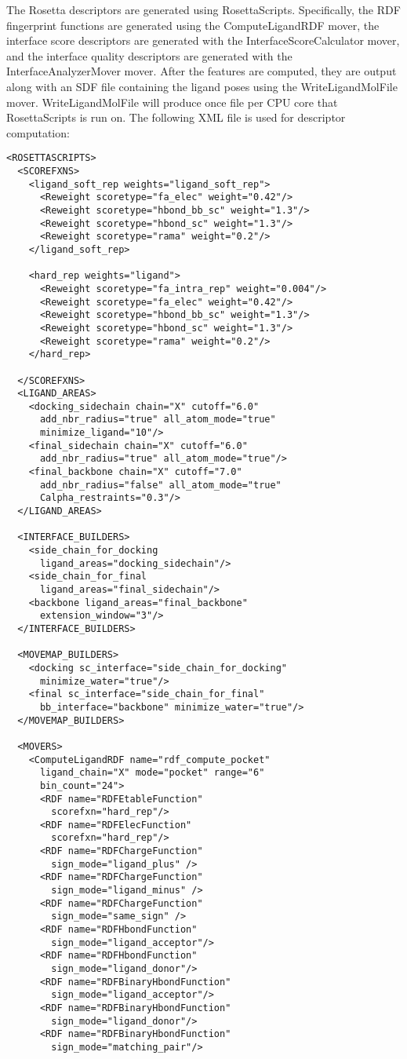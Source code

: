 The Rosetta descriptors are generated using RosettaScripts.
Specifically, the \ac{RDF} fingerprint functions are generated using the ComputeLigandRDF mover, the interface score descriptors are generated with the InterfaceScoreCalculator mover, and the interface quality descriptors are generated with the InterfaceAnalyzerMover mover. 
After the features are computed, they are output along with an \ac{SDF} file containing the ligand poses using the WriteLigandMolFile mover.
WriteLigandMolFile will produce once file per \ac{CPU} core that RosettaScripts is run on.
The following \ac{XML} file is used for descriptor computation:
\singlespace
\begin{verbatim}
<ROSETTASCRIPTS>
  <SCOREFXNS>
    <ligand_soft_rep weights="ligand_soft_rep">
      <Reweight scoretype="fa_elec" weight="0.42"/>
      <Reweight scoretype="hbond_bb_sc" weight="1.3"/>
      <Reweight scoretype="hbond_sc" weight="1.3"/>
      <Reweight scoretype="rama" weight="0.2"/>
    </ligand_soft_rep>
  
    <hard_rep weights="ligand">
      <Reweight scoretype="fa_intra_rep" weight="0.004"/>
      <Reweight scoretype="fa_elec" weight="0.42"/>
      <Reweight scoretype="hbond_bb_sc" weight="1.3"/>
      <Reweight scoretype="hbond_sc" weight="1.3"/>
      <Reweight scoretype="rama" weight="0.2"/>
    </hard_rep>
    
  </SCOREFXNS>
  <LIGAND_AREAS>
    <docking_sidechain chain="X" cutoff="6.0"
      add_nbr_radius="true" all_atom_mode="true"
      minimize_ligand="10"/>
    <final_sidechain chain="X" cutoff="6.0"
      add_nbr_radius="true" all_atom_mode="true"/>
    <final_backbone chain="X" cutoff="7.0"
      add_nbr_radius="false" all_atom_mode="true" 
      Calpha_restraints="0.3"/>
  </LIGAND_AREAS>
  
  <INTERFACE_BUILDERS>
    <side_chain_for_docking 
      ligand_areas="docking_sidechain"/>
    <side_chain_for_final 
      ligand_areas="final_sidechain"/>
    <backbone ligand_areas="final_backbone" 
      extension_window="3"/>
  </INTERFACE_BUILDERS>
  
  <MOVEMAP_BUILDERS>
    <docking sc_interface="side_chain_for_docking"
      minimize_water="true"/>
    <final sc_interface="side_chain_for_final"
      bb_interface="backbone" minimize_water="true"/>
  </MOVEMAP_BUILDERS>
  
  <MOVERS>
    <ComputeLigandRDF name="rdf_compute_pocket" 
      ligand_chain="X" mode="pocket" range="6"
      bin_count="24">
      <RDF name="RDFEtableFunction"
        scorefxn="hard_rep"/>
      <RDF name="RDFElecFunction"
        scorefxn="hard_rep"/>
      <RDF name="RDFChargeFunction"
        sign_mode="ligand_plus" />
      <RDF name="RDFChargeFunction"
        sign_mode="ligand_minus" />
      <RDF name="RDFChargeFunction"
        sign_mode="same_sign" />
      <RDF name="RDFHbondFunction"
        sign_mode="ligand_acceptor"/>
      <RDF name="RDFHbondFunction"
        sign_mode="ligand_donor"/> 
      <RDF name="RDFBinaryHbondFunction"
        sign_mode="ligand_acceptor"/>
      <RDF name="RDFBinaryHbondFunction"
        sign_mode="ligand_donor"/>
      <RDF name="RDFBinaryHbondFunction"
        sign_mode="matching_pair"/>      


\end{verbatim}

